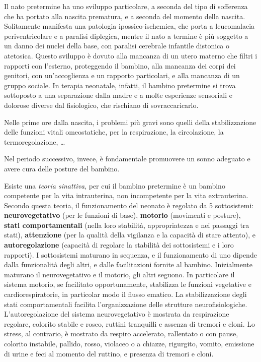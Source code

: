 Il nato pretermine ha uno sviluppo particolare, a seconda del tipo di sofferenza che ha portato alla nascita
prematura, e a seconda del momento della nascita. Solitamente manifesta una patologia ipossico-ischemica, che porta
a leucomalacia periventricolare e a paralisi diplegica, mentre il nato a termine è più soggetto a un danno dei nuclei
della base, con paralisi cerebrale infantile distonica o atetosica.
Questo sviluppo è dovuto alla mancanza di un utero materno che filtri i rapporti con l'esterno, proteggendo il bambino,
alla mancanza dei corpi dei genitori, con un'accoglienza e un rapporto particolari, e alla mancanza di un gruppo sociale.
In terapia neonatale, infatti, il bambino pretermine si trova sottoposto a una separazione dalla madre e a molte
esperienze sensoriali e dolorose diverse dal fisiologico, che rischiano di sovraccaricarlo.

Nelle prime ore dalla nascita, i problemi più gravi sono quelli della stabilizzazione delle funzioni vitali omeostatiche,
per la respirazione, la circolazione, la termoregolazione, \dots

Nel periodo successivo, invece, è fondamentale promuovere un sonno adeguato e avere cura delle posture del bambino.

Esiste una \textit{teoria sinattiva}, per cui il bambino pretermine è un bambino competente per la vita intrauterina, non
incompetente per la vita extrauterina. Secondo questa teoria, il funzionamento del neonato è regolato da 5 sottosistemi:
\textbf{neurovegetativo} (per le funzioni di base), \textbf{motorio} (movimenti e posture), \textbf{stati comportamentali}
(nella loro stabilità, appropriatezza e nei passaggi tra stati), \textbf{attenzione} (per la qualità della vigilanza e la
capacità di stare attento), e \textbf{autoregolazione} (capacità di regolare la stabilità dei sottosistemi e i loro rapporti).
I sottosistemi maturano in sequenza, e il funzionamento di uno dipende dalla funzionalità degli altri, e dalle facilitazioni
fornite al bambino. Inizialmente maturano il neurovegetativo e il motorio, gli altri seguono. In particolare il sistema
motorio, se facilitato opportunamente, stabilizza le funzioni vegetative e cardiorespiratorie, in particolar modo il flusso
ematico. La stabilizzazione degli stati comportamentali facilita l'organizzazione delle strutture neurofisiologiche.
L'autoregolazione del sistema neurovegetativo è mostrata da respirazione regolare, colorito stabile e roseo, ruttini tranquilli
e assenza di tremori e cloni. Lo stress, al contrario, è mostrato da respiro accelerato, rallentato o con pause, colorito
instabile, pallido, rosso, violaceo o a chiazze, rigurgito, vomito, emissione di urine e feci al momento del ruttino, e presenza
di tremori e cloni.

